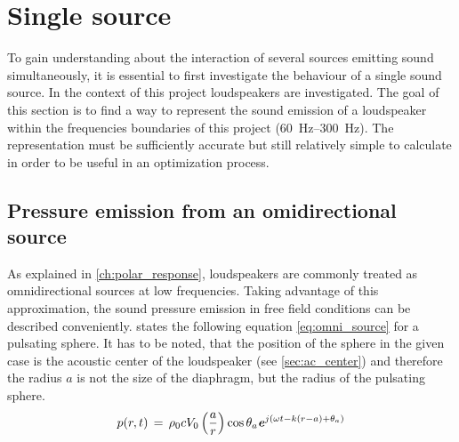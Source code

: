 \section{Single source}\label{ch:single_speaker_source}
To gain understanding about the interaction of several sources emitting sound simultaneously, it is essential to first investigate the behaviour of a single sound source. In the context of this project loudspeakers are investigated. The goal of this section is to find a way to represent the sound emission of a loudspeaker within the frequencies boundaries of this project (\SIrange{60}{300}{\hertz}).
The representation must be sufficiently accurate but still relatively simple to calculate in order to be useful in an optimization process.

\subsection{Pressure emission from an omidirectional source}\label{ssec:omni}
As explained in \autoref{ch:polar_response}, loudspeakers are commonly treated as omnidirectional sources at low frequencies. Taking advantage of this approximation, the sound pressure emission in free field conditions can be described conveniently. \citep[p. 171]{Kinsler2000} states the following equation \autoref{eq:omni_source} for a pulsating sphere. It has to be noted, that the position of the sphere in the given case is the acoustic center of the loudspeaker (see \autoref{sec:ac_center}) and therefore the radius $a$ is not the size of the diaphragm, but the radius of the pulsating sphere.
\begin{equation}\label{eq:omni_source}
p(r,t)\,=\,\rho_0 c V_0 \left(\frac{a}{r}\right)\cos \theta_a \textbf{\textit{e}}^{j\left(\omega t - k(r-a)+\theta_a\right)}
\end{equation}
\startexplain
{}
\stopexplain

